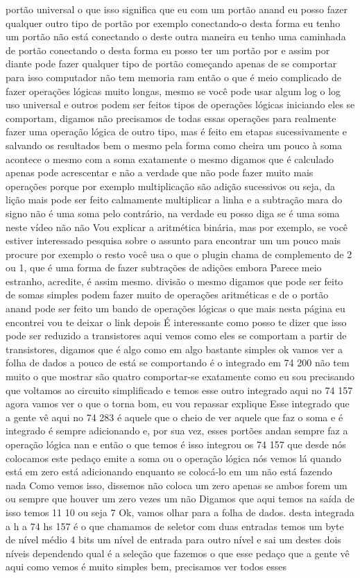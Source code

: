 \documentclass[oneside,11pt]{memoir} %
\begin{document}
portão universal  o que isso significa que eu com um  portão anand eu posso fazer qualquer  outro tipo de portão por exemplo  conectando-o desta forma eu tenho um  portão não está conectando o deste  outra maneira eu tenho uma caminhada de portão  conectando o desta forma eu posso ter  um portão por e assim por diante  pode fazer qualquer tipo de portão  começando apenas de se comportar para isso  computador não tem memoria ram então  o que é meio complicado de fazer  operações lógicas muito longas, mesmo se  você pode usar algum log o log  uso universal e outros podem ser feitos  tipos de operações lógicas iniciando  eles se comportam, digamos não  precisamos de todas essas operações para  realmente fazer uma operação lógica de  outro tipo, mas é feito em etapas  sucessivamente e salvando os resultados  bem o mesmo pela forma como cheira um pouco  à soma acontece o mesmo com a soma  exatamente o mesmo  digamos que é calculado apenas  pode acrescentar e não a verdade que não pode  fazer muito mais operações porque por  exemplo multiplicação são adição  sucessivos ou seja, da lição  mais pode ser feito  calmamente multiplicar a linha e  a subtração mara do signo não é uma soma  pelo contrário, na verdade eu posso  diga se é uma soma neste vídeo não não  Vou explicar a aritmética binária, mas  por exemplo, se você estiver interessado  pesquisa sobre o assunto para encontrar um  um pouco mais procure por exemplo o resto  você usa o que o plugin chama de  complemento de 2 ou 1, que é uma forma de  fazer subtrações de adições embora  Parece meio estranho, acredite, é assim mesmo.  divisão o mesmo  digamos que pode ser feito de  somas simples podem fazer muito  de operações aritméticas e de  o portão anand pode ser feito um  bando de operações lógicas  o que mais nesta página eu encontrei  vou te deixar o link depois  É interessante como posso te dizer que isso  pode ser reduzido a transistores aqui  vemos como eles se comportam  a partir de transistores, digamos que é  algo como em algo bastante simples  ok vamos ver a folha de dados a  pouco de está se comportando é o  integrado em 74 200  não tem muito o que mostrar são quatro  comportar-se exatamente como eu sou  precisando  que voltamos ao circuito  simplificado e temos esse outro  integrado aqui no 74 157 agora vamos  ver o que o torna bom, eu vou repassar  explique  Esse integrado que a gente vê aqui no 74 283  é aquele que o cheio de ver aquele que faz o  soma e é integrado é sempre  adicionando e, por sua vez, esses portões  andan sempre faz a operação lógica  nan e então o que temos é isso  integrou os 74 157 que desde  nós colocamos este pedaço  emite a soma ou o  operação lógica nós vemos lá quando  está em zero está adicionando enquanto  se colocá-lo em um não está fazendo nada  Como vemos isso, dissemos não  coloca um zero apenas se ambos forem  um ou sempre que houver um zero vezes um não  Digamos que aqui temos na saída de  isso temos 11 10 ou seja 7  Ok, vamos olhar para a folha de dados.  desta integrada a h a 74 hs  157 é o que chamamos de seletor  com duas entradas  temos um byte de nível médio 4 bits  um nível de entrada para outro nível e sai  um destes dois níveis dependendo  qual é a seleção que fazemos o que  esse pedaço que a gente vê aqui  como vemos é muito simples  bem, precisamos ver todos esses  
\end{document}
